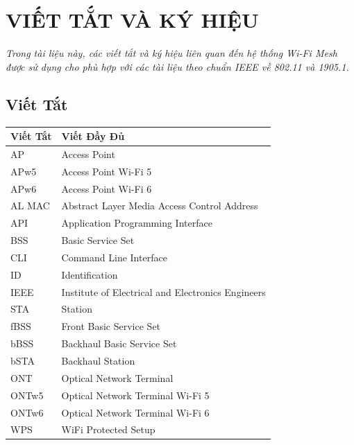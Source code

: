 \chapter*{VIẾT TẮT VÀ KÝ HIỆU}

\emph{ Trong tài liệu này, các viết tắt và ký hiệu liên quan đến hệ thống Wi-Fi Mesh được sử dụng cho phù hợp với các tài liệu theo chuẩn IEEE về 802.11 và 1905.1.}

\section*{ Viết Tắt}

\begin{longtable}{p{2.5cm}p{8cm}}
    \toprule
    Viết Tắt & Viết Đầy Đủ \\
    \midrule\endhead %
    AP & Access Point \\
    APw5 & Access Point Wi-Fi 5 \\
    APw6 & Access Point Wi-Fi 6\\
    AL MAC & Abstract Layer Media Access Control Address\\
    API & Application Programming Interface\\
    BSS & Basic Service Set\\
    CLI & Command Line Interface \\
    ID & Identification\\
    IEEE & Institute of Electrical and Electronics Engineers \\
    STA & Station \\ 
    fBSS & Front Basic Service Set \\
    bBSS & Backhaul Basic Service Set \\
    bSTA & Backhaul Station \\
    ONT & Optical Network Terminal \\
    ONTw5 & Optical Network Terminal Wi-Fi 5 \\
    ONTw6 & Optical Network Terminal Wi-Fi 6 \\
    WPS & WiFi Protected Setup \\
    \bottomrule
\end{longtable}


